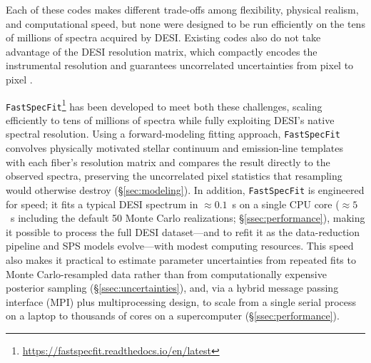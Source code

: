 \documentclass[modern,linenumbers]{aastex702}
\newcommand{\fastspecfit}{\texttt{FastSpecFit}}
\begin{document}
Each of these codes makes different trade-offs among flexibility,
physical realism, and computational speed, but none were designed to
be run efficiently on the tens of millions of spectra acquired by
DESI. Existing codes also do not take advantage of the DESI resolution
matrix, which compactly encodes the instrumental resolution and
guarantees uncorrelated uncertainties from
pixel to pixel \citep{bolton10a,
  guy23a}.

\fastspecfit\footnote{\url{https://fastspecfit.readthedocs.io/en/latest}}
has been developed to meet both these challenges, scaling efficiently
to tens of millions of spectra while fully exploiting DESI's native
spectral resolution. Using a forward-modeling fitting approach,
\fastspecfit{} convolves physically motivated stellar continuum and
emission-line templates with each fiber's resolution matrix and
compares the result directly to the observed spectra, preserving the
uncorrelated pixel statistics that resampling would otherwise destroy
(\S\ref{sec:modeling}). In addition, \fastspecfit{} is engineered for
speed; it fits a typical DESI spectrum in $\approx0.1$~s on a single
CPU core ($\approx5$~s including the default 50 Monte Carlo
realizations; \S\ref{ssec:performance}), making it possible to process
the full DESI dataset---and to refit it as the data-reduction pipeline
and SPS models evolve---with modest computing resources. This speed
also makes it practical to estimate parameter uncertainties from
repeated fits to Monte Carlo-resampled data rather than from
computationally expensive posterior sampling
(\S\ref{ssec:uncertainties}), and, via a hybrid message passing
interface (MPI) plus multiprocessing design, to scale from a single
serial process on a laptop to thousands of cores on a supercomputer
(\S\ref{ssec:performance}).
\end{document}
